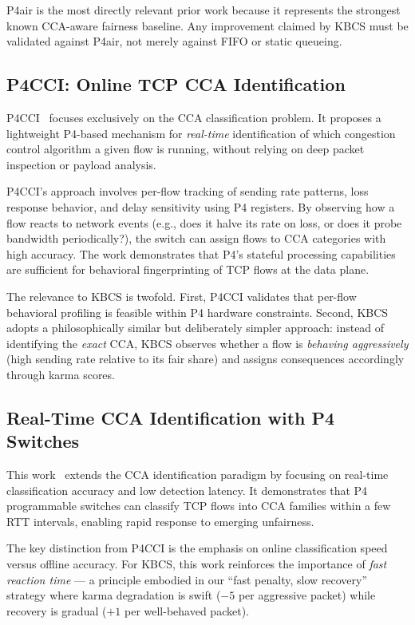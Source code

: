 \documentclass[12pt,a4paper]{report}
\begin{document}
P4air is the most directly relevant prior work because it represents the strongest known CCA-aware fairness baseline. Any improvement claimed by KBCS must be validated against P4air, not merely against FIFO or static queueing.

\subsection{P4CCI: Online TCP CCA Identification}
P4CCI~\cite{p4cci} focuses exclusively on the CCA classification problem. It proposes a lightweight P4-based mechanism for \textit{real-time} identification of which congestion control algorithm a given flow is running, without relying on deep packet inspection or payload analysis.

P4CCI's approach involves per-flow tracking of sending rate patterns, loss response behavior, and delay sensitivity using P4 registers. By observing how a flow reacts to network events (e.g., does it halve its rate on loss, or does it probe bandwidth periodically?), the switch can assign flows to CCA categories with high accuracy. The work demonstrates that P4's stateful processing capabilities are sufficient for behavioral fingerprinting of TCP flows at the data plane.

The relevance to KBCS is twofold. First, P4CCI validates that per-flow behavioral profiling is feasible within P4 hardware constraints. Second, KBCS adopts a philosophically similar but deliberately simpler approach: instead of identifying the \textit{exact} CCA, KBCS observes whether a flow is \textit{behaving aggressively} (high sending rate relative to its fair share) and assigns consequences accordingly through karma scores.

\subsection{Real-Time CCA Identification with P4 Switches}
This work~\cite{realtimecca} extends the CCA identification paradigm by focusing on real-time classification accuracy and low detection latency. It demonstrates that P4 programmable switches can classify TCP flows into CCA families within a few RTT intervals, enabling rapid response to emerging unfairness.

The key distinction from P4CCI is the emphasis on online classification speed versus offline accuracy. For KBCS, this work reinforces the importance of \textit{fast reaction time} — a principle embodied in our ``fast penalty, slow recovery'' strategy where karma degradation is swift ($-5$ per aggressive packet) while recovery is gradual ($+1$ per well-behaved packet).
\end{document}
